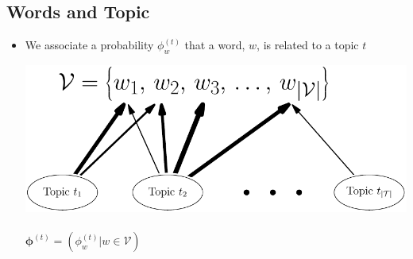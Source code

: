 
\begin{slide}
\section{Words and Topic}

\begin{PauseHighLight}
  \begin{itemize}
  \item We associate a probability $\phi^{(t)}_w$ that a word, $w$, is
    related to a topic $t$\pause
    \begin{center}
      \includegraphics[width=0.7\linewidth]{topicModel1}\\\ \\
      $\bm{\phi}^{(t)} = (\phi^{(t)}_w | w \in \mathcal{V})$\pause
    \end{center}
  \end{itemize}
\end{PauseHighLight}

\end{slide}


